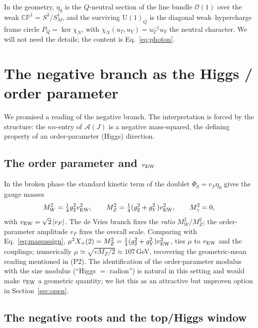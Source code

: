 \documentclass[11pt]{article}
\theoremstyle{plain}
\theoremstyle{definition}
\newcommand{\cA}{\mathcal{A}}
\newcommand{\cO}{\mathcal{O}}
\newcommand{\Xp}{X_{+}}
\newcommand{\U}{\mathrm{U}}
\begin{document}
In the geometry, $\eta_0$ is the $Q$-neutral section of the line bundle
$\cO(1)$ over the weak $\mathbb{CP}^1=S^3/S^1_M$, and the surviving
$\U(1)_Q$ is the diagonal weak--hypercharge frame circle
$P_Q=\ker\chi_N$, with $\chi_N(u_T,u_Y)=u_T^{-1}u_Y$ the neutral character.
We will not need the details; the content is Eq.~\eqref{eq:photon}.

\section{The negative branch as the Higgs / order parameter}
\label{sec:higgs}

We promised a reading of the negative branch. The interpretation is forced
by the structure: the $nn$-entry of $\cA(J)$ is a negative mass-squared, the
defining property of an order-parameter (Higgs) direction.

\subsection{The order parameter and $v_{\rm EW}$}

In the broken phase the standard kinetic term of the doublet
$\Phi_0=v_F\eta_0$ gives the gauge masses
\begin{equation}
M_W^2=\tfrac14 g_2^2 v_{\rm EW}^2,\qquad
M_Z^2=\tfrac14(g_2^2+g_Y^2)v_{\rm EW}^2,\qquad
M_\gamma^2=0,
\end{equation}
with $v_{\rm EW}=\sqrt2\,|v_F|$. The de Vries branch fixes the
\emph{ratio} $M_W^2/M_Z^2$; the order-parameter amplitude $v_F$ fixes the
overall scale. Comparing with Eq.~\eqref{eq:massassign},
$\mu^2\Xp(2)=M_Z^2=\tfrac14(g_2^2+g_Y^2)v_{\rm EW}^2$, ties $\mu$ to
$v_{\rm EW}$ and the couplings; numerically $\mu\simeq\sqrt{vM_Z/2}\approx
107\,$GeV, recovering the geometric-mean reading mentioned in (P2). The
identification of the order-parameter modulus with the size modulus
(``Higgs $=$ radion'') is natural in this setting and would make $v_{\rm EW}$
a geometric quantity; we list this as an attractive but unproven option in
Section~\ref{sec:open}.

\subsection{The negative roots and the top/Higgs window}
\end{document}
